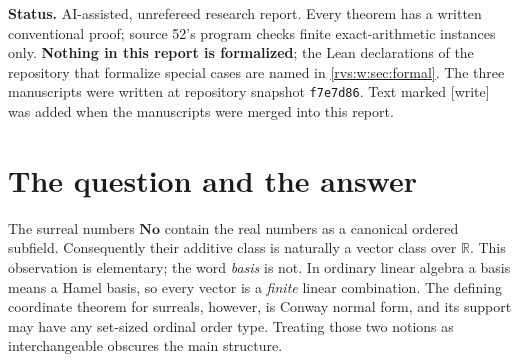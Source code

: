 \documentclass[11pt,letterpaper]{article}
\numberwithin{equation}{section}
\theoremstyle{definition}
\theoremstyle{remark}
\newcommand{\No}{\mathbf{No}}
\newcommand{\R}{\mathbb{R}}
\newcommand{\RepoShort}{f7e7d86}
\newcommand{\EuD}{\mathfrak D}%
\newcommand{\wtag}{\textup{[write]}}%
\begin{document}
\begin{titlepage}
\begin{minipage}{0.94\textwidth}
\begin{abstract}
The linear structure that \emph{is} canonical is described in detail:
support projections, convex subspaces (classical), the commutant of the
coordinate projections, positive diagonal operators, finite real linear
systems, valuation bases on finite-dimensional subspaces and their global
failure, strong linear maps as Hahn-compatible column families, the strong
real dual (summation-finite weights), the vanishing of the order-bounded
dual, and the rigidity of set-indexed convergence that keeps normal forms
from being Schauder expansions.  For real exponent groups the Euler operator
\(\EuD(t^\gamma)=\gamma t^\gamma\) makes \(\R((t^\Gamma))\) modulo its
finite-monomial part a continuum-dimensional \(\R(X)\)-vector space; every
real-linear map commuting with \(\EuD\) is a strong coefficient multiplier,
and the finite-monomial part has no \(\EuD\)-invariant complement.
Results that re-prove material of other reports of the collection
(completion of Hahn vector spaces, monomial automorphisms, Euler
derivations) are printed as pointers with the sources' proofs as second
routes.
\end{abstract}
\end{minipage}
\vfill
\begin{minipage}{0.94\textwidth}\small
\textbf{Status.}  AI-assisted, unrefereed research report.  Every
theorem has a written conventional proof; source 52's program checks finite
exact-arithmetic instances only.  \textbf{Nothing in this report is
formalized}; the Lean declarations of the repository that formalize special
cases are named in \cref{rvs:w:sec:formal}.  The three manuscripts were
written at repository snapshot \texttt{\RepoShort}.  Text marked \wtag{} was
added when the manuscripts were merged into this report.
\end{minipage}
\end{titlepage}
\hypersetup{pageanchor=true}

\begingroup
\small
\setlength{\parskip}{0pt}
\tableofcontents
\endgroup
\clearpage
{}

\section{The question and the answer}\label{rvs:sec:intro}
\label{rvs:eu:sec:intro}

The surreal numbers \(\No\) contain the real numbers as a canonical ordered
subfield.  Consequently their additive class is naturally a vector class over
\(\R\).  This observation is elementary; the word \emph{basis} is not.  In
ordinary linear algebra a basis means a Hamel basis, so every vector is a
\emph{finite} linear combination.  The defining coordinate theorem for
surreals, however, is Conway normal form, and its support may have any
set-sized ordinal order type.  Treating those two notions as interchangeable
obscures the main structure.
\end{document}
